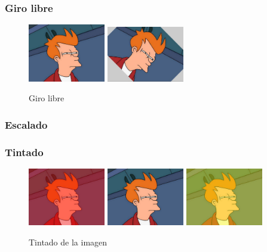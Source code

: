 \subsubsection{Giro libre}
\vskip0.3cm
\begin{figure}[H]
 \centering
  \includegraphics[width=0.3\textwidth]{imagenes/Fry.jpg}
  \includegraphics[width=0.3\textwidth]{imagenes/fryGiro.jpg}
 \caption{Giro libre}
 \label{diseño}
\end{figure}
\subsubsection{Escalado}
\subsubsection{Tintado}
\vskip0.3cm
\begin{figure}[H]
 \centering
  \includegraphics[width=0.3\textwidth]{imagenes/fryTinteRojo.jpg}
  \includegraphics[width=0.3\textwidth]{imagenes/Fry.jpg}
  \includegraphics[width=0.3\textwidth]{imagenes/fryTinteAmarillo.jpg}
 \caption{Tintado de la imagen}
 \label{diseño}
\end{figure}
